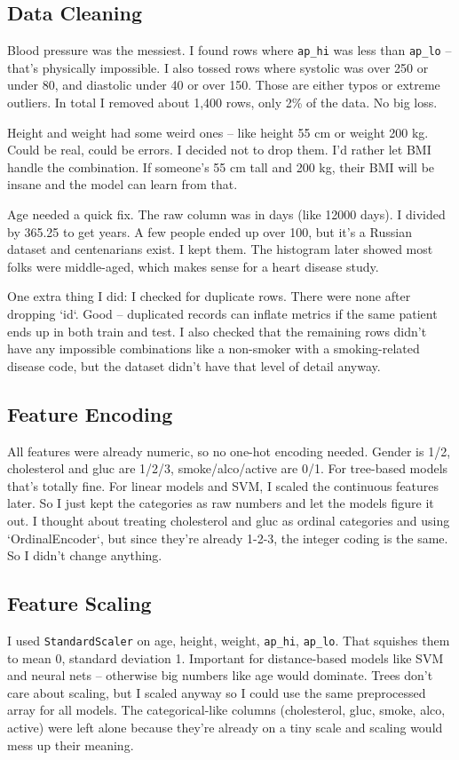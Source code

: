 \documentclass[12pt, a4paper, oneside]{book}
\begin{document}
\subsection{Data Cleaning}
Blood pressure was the messiest. I found rows where \texttt{ap\_hi} was less than \texttt{ap\_lo} -- that's physically impossible. I also tossed rows where systolic was over 250 or under 80, and diastolic under 40 or over 150. Those are either typos or extreme outliers. In total I removed about 1,400 rows, only 2\% of the data. No big loss.

Height and weight had some weird ones -- like height 55 cm or weight 200 kg. Could be real, could be errors. I decided not to drop them. I'd rather let BMI handle the combination. If someone's 55 cm tall and 200 kg, their BMI will be insane and the model can learn from that.

Age needed a quick fix. The raw column was in days (like 12000 days). I divided by 365.25 to get years. A few people ended up over 100, but it's a Russian dataset and centenarians exist. I kept them. The histogram later showed most folks were middle-aged, which makes sense for a heart disease study.

One extra thing I did: I checked for duplicate rows. There were none after dropping `id`. Good -- duplicated records can inflate metrics if the same patient ends up in both train and test. I also checked that the remaining rows didn't have any impossible combinations like a non-smoker with a smoking-related disease code, but the dataset didn't have that level of detail anyway.

\subsection{Feature Encoding}
All features were already numeric, so no one-hot encoding needed. Gender is 1/2, cholesterol and gluc are 1/2/3, smoke/alco/active are 0/1. For tree-based models that's totally fine. For linear models and SVM, I scaled the continuous features later. So I just kept the categories as raw numbers and let the models figure it out. I thought about treating cholesterol and gluc as ordinal categories and using `OrdinalEncoder`, but since they're already 1-2-3, the integer coding is the same. So I didn't change anything.

\subsection{Feature Scaling}
I used \texttt{StandardScaler} on age, height, weight, \texttt{ap\_hi}, \texttt{ap\_lo}. That squishes them to mean 0, standard deviation 1. Important for distance-based models like SVM and neural nets -- otherwise big numbers like age would dominate. Trees don't care about scaling, but I scaled anyway so I could use the same preprocessed array for all models. The categorical-like columns (cholesterol, gluc, smoke, alco, active) were left alone because they're already on a tiny scale and scaling would mess up their meaning.
\end{document}
